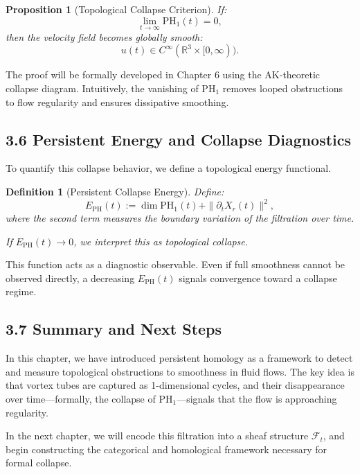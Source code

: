 \documentclass[11pt]{article}
\newtheorem{definition}[theorem]{Definition}
\newtheorem{proposition}[theorem]{Proposition}
\begin{document}
\begin{proposition}[Topological Collapse Criterion]
\label{prop:PHcollapse}
If:
\[
\lim_{t \to \infty} \mathrm{PH}_1(t) = 0,
\]
then the velocity field becomes globally smooth:
\[
u(t) \in C^\infty(\mathbb{R}^3 \times [0,\infty)).
\]
\end{proposition}

The proof will be formally developed in Chapter 6 using the AK-theoretic collapse diagram.  
Intuitively, the vanishing of \( \mathrm{PH}_1 \) removes looped obstructions to flow regularity and ensures dissipative smoothing.

\subsection{3.6 Persistent Energy and Collapse Diagnostics}

To quantify this collapse behavior, we define a topological energy functional.

\begin{definition}[Persistent Collapse Energy]
Define:
\[
E_{\mathrm{PH}}(t) := \dim \mathrm{PH}_1(t) + \|\partial_t X_r(t)\|^2,
\]
where the second term measures the boundary variation of the filtration over time.

If \( E_{\mathrm{PH}}(t) \to 0 \), we interpret this as topological collapse.
\end{definition}

This function acts as a diagnostic observable. Even if full smoothness cannot be observed directly, a decreasing \( E_{\mathrm{PH}}(t) \) signals convergence toward a collapse regime.

\subsection{3.7 Summary and Next Steps}

In this chapter, we have introduced persistent homology as a framework to detect and measure topological obstructions to smoothness in fluid flows.  
The key idea is that vortex tubes are captured as 1-dimensional cycles, and their disappearance over time—formally, the collapse of \( \mathrm{PH}_1 \)—signals that the flow is approaching regularity.

In the next chapter, we will encode this filtration into a sheaf structure \( \mathcal{F}_t \), and begin constructing the categorical and homological framework necessary for formal collapse.
\end{document}

